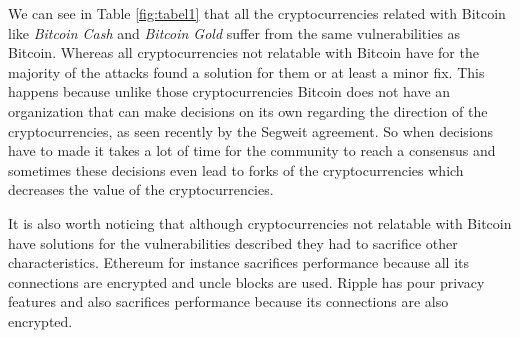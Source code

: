 We can see in Table \ref{fig:tabel1} that all the cryptocurrencies related with Bitcoin like \textit{Bitcoin Cash} and \textit{Bitcoin Gold} suffer from the same vulnerabilities as Bitcoin. Whereas all cryptocurrencies not relatable with Bitcoin have for the majority of the attacks found a solution for them or at least a minor fix. This happens because unlike those cryptocurrencies Bitcoin does not have an organization that can make decisions on its own regarding the direction of the cryptocurrencies, as seen recently by the Segweit agreement. So when decisions have to made it takes a lot of time for the community to reach a consensus and sometimes these decisions even lead to forks of the cryptocurrencies which decreases the value of the cryptocurrencies.

It is also worth noticing that although cryptocurrencies not relatable with Bitcoin have solutions for the vulnerabilities described they had to sacrifice other characteristics. Ethereum for instance sacrifices performance because all its connections are encrypted and uncle blocks are used. Ripple has pour privacy features and also sacrifices performance because its connections are also encrypted.

